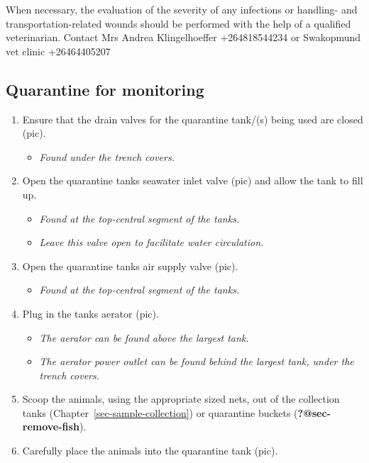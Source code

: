 \documentclass[
  letterpaper,
  DIV=11,
  numbers=noendperiod]{scrreprt}
\providecommand{\tightlist}{%
  \setlength{\itemsep}{0pt}\setlength{\parskip}{0pt}}\usepackage{longtable,booktabs,array}
\begin{document}
{When necessary, the evaluation of the severity of any infections or
handling- and transportation-related wounds should be performed with the
help of a qualified veterinarian. Contact Mrs Andrea Klingelhoeffer
+264818544234 or Swakopmund vet clinic +26464405207}

\hypertarget{sec-qt-monitor}{%
\subsection{Quarantine for monitoring}\label{sec-qt-monitor}}

\begin{enumerate}
\def\labelenumi{\arabic{enumi}.}
\item
  Ensure that the drain valves for the quarantine tank/(s) being used
  are closed (pic).

  \begin{itemize}
  \tightlist
  \item
    \emph{Found under the trench covers.}
  \end{itemize}
\item
  Open the quarantine tanks seawater inlet valve (pic) and allow the
  tank to fill up.

  \begin{itemize}
  \tightlist
  \item
    \emph{Found at the top-central segment of the tanks.}
  \item
    \emph{Leave this valve open to facilitate water circulation.}
  \end{itemize}
\item
  Open the quarantine tanks air supply valve (pic).

  \begin{itemize}
  \tightlist
  \item
    \emph{Found at the top-central segment of the tanks.}
  \end{itemize}
\item
  Plug in the tanks aerator (pic).

  \begin{itemize}
  \tightlist
  \item
    \emph{The aerator can be found above the largest tank.}
  \item
    \emph{The aerator power outlet can be found behind the largest tank,
    under the trench covers.}
  \end{itemize}
\item
  Scoop the animals, using the appropriate sized nets, out of the
  collection tanks (Chapter~\ref{sec-sample-collection}) or quarantine
  buckets (\textbf{?@sec-remove-fish}).
\item
  Carefully place the animals into the quarantine tank (pic).


\end{enumerate}
\end{document}
